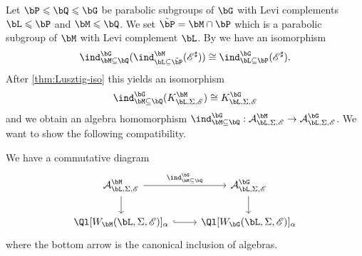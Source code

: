 \documentclass[eqthmnum,nocolour,skinny]{jt-calcs}
\begin{document}
\begin{pa}
Let $\bP \leqslant \bQ \leqslant \bG$ be parabolic subgroups of $\bG$ with Levi complements $\bL \leqslant \bP$ and $\bM \leqslant \bQ$. We set $\tilde{\bP} = \bM \cap \bP$ which is a parabolic subgroup of $\bM$ with Levi complement $\bL$. By \cite[4.2, 4.4]{lusztig:1985:character-sheaves} we have an isomorphism
\begin{equation}\label{eq:iso-ind}
\ind_{\bM \subseteq \bQ}^{\bG}(\ind_{\bL \subseteq \tilde{\bP}}^{\bM}(\mathscr{E}^{\sharp})) \cong \ind_{\bL \subseteq \bP}^{\bG}(\mathscr{E}^{\sharp}).
\end{equation}
After \cref{thm:Lusztig-iso} this yields an isomorphism
\begin{equation*}
\ind_{\bM\subseteq\bQ}^{\bG}(K_{\bL,\Sigma,\mathscr{E}}^{\bM}) \cong K_{\bL,\Sigma,\mathscr{E}}^{\bG}
\end{equation*}
and we obtain an algebra homomorphism $\ind_{\bM\subseteq\bQ}^{\bG} : \mathcal{A}_{\bL,\Sigma,\mathscr{E}}^{\bM} \to \mathcal{A}_{\bL,\Sigma,\mathscr{E}}^{\bG}$. We want to show the following compatibility.
\end{pa}

\begin{prop}\label{lem:end-alg-identifications}
We have a commutative diagram
\begin{equation*}
\begin{tikzcd}
\mathcal{A}_{\bL,\Sigma,\mathscr{E}}^{\bM} \arrow[r,"\ind_{\bM\subseteq\bQ}^{\bG}"]\arrow[d] & \mathcal{A}_{\bL,\Sigma,\mathscr{E}}^{\bG} \arrow[d]\\
\Ql[W_{\bM}(\bL,\Sigma,\mathscr{E})]_{\alpha} \arrow[r,hook] & \Ql[W_{\bG}(\bL,\Sigma,\mathscr{E})]_{\alpha}
\end{tikzcd}
\end{equation*}
where the bottom arrow is the canonical inclusion of algebras.
\end{prop}
\end{document}

